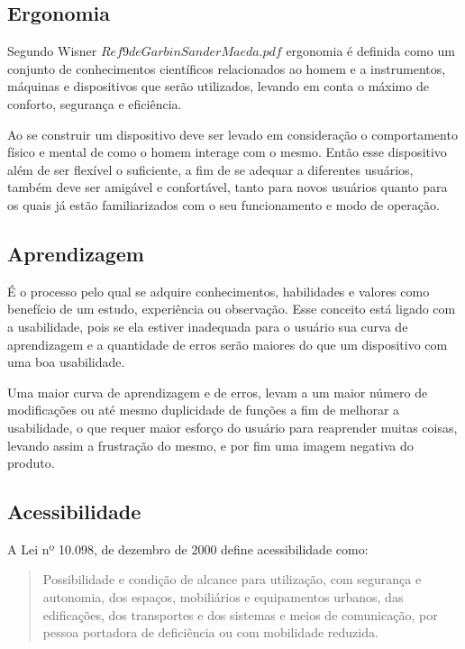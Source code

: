 \documentclass[
	12pt,			%
	openright,		%
	oneside,			%
	a4paper,			%
	chapter=TITLE,		%
	english,			%
	brazil,			%
	]{abntex2}
\begin{document}
\subsection{Ergonomia}

Segundo Wisner \(Ref 9 de Garbin Sander Maeda.pdf\) ergonomia é definida como um conjunto de conhecimentos científicos relacionados ao homem e a instrumentos, máquinas e dispositivos que serão utilizados, levando em conta o máximo de conforto, segurança e eficiência.

Ao se construir um dispositivo deve ser levado em consideração o comportamento físico e mental de como o homem interage com o mesmo. Então esse dispositivo além de ser flexível o suficiente, a fim de se adequar a diferentes usuários, também deve ser amigável e confortável, tanto para novos usuários quanto para os quais já estão familiarizados com o seu funcionamento e modo de operação.

\subsection{Aprendizagem}

É o processo pelo qual se adquire conhecimentos, habilidades e valores como benefício de um estudo, experiência ou observação. Esse conceito está ligado com a usabilidade, pois se ela estiver inadequada para o usuário sua curva de aprendizagem e a quantidade de erros serão maiores do que um dispositivo com uma boa usabilidade.

Uma maior curva de aprendizagem e de erros, levam a um maior número de modificações ou até mesmo duplicidade de funções a fim de melhorar a usabilidade, o que requer maior esforço do usuário para reaprender muitas coisas, levando assim a frustração do mesmo, e por fim uma imagem negativa do produto.

\subsection{Acessibilidade}

A Lei nº 10.098, de dezembro de 2000 define acessibilidade como:

\begin{quote}\small\setlength{\leftskip}{4cm}
Possibilidade e condição de alcance para utilização, com segurança e autonomia, dos espaços, mobiliários e equipamentos urbanos, das edificações, dos transportes e dos sistemas e meios de comunicação, por pessoa portadora de deficiência ou com mobilidade reduzida.
\end{quote}
\end{document}
